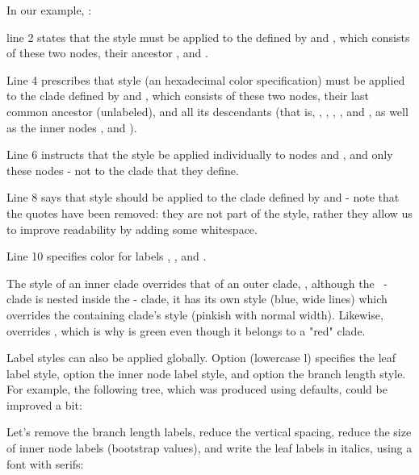 \noindent{}In our example, :
\startitemize
	\item line 2 states that the style  must be applied
		to the  defined by  and
		, which consists of these two nodes, their ancestor
		, and . 
	\item Line 4 prescribes that style  (an \svg{}
		hexadecimal color specification) must be applied to the clade defined by
		 and , which consists of these two nodes,
		their last common ancestor (unlabeled), and all its descendants (that is,
		, , , , and
		, as well as the inner nodes ,
		 and ). 
	\item Line 6 instructs that the style  be applied
		individually to nodes  and , and only
		these nodes - not to the clade that they define.  
	\item Line 8 says that style  should be
		applied to the clade defined by  and  - note that
		the quotes have been removed: they are not part of the style, rather they
		allow us to improve readability by adding some whitespace.
	\item Line 10 specifies color  for labels ,
		,
		and .
\stopitemize

The style of an inner clade overrides that of an outer clade, \eg,
although the ~-~ clade is nested inside the
 -  clade, it has its own style (blue, wide
lines) which overrides the containing clade's style (pinkish with normal
width).  Likewise,  overrides , which is why
 is green even though it belongs to a "red" clade.

\bigskip

Label styles can also be applied globally. Option  (lowercase l)
specifies the leaf label style, option  the inner node label style,
and option  the branch length style. For example, the following tree,
which was produced using defaults, could be improved a bit:


\noindent{}Let's remove the branch length labels, reduce
the vertical spacing, reduce the size of inner node labels (bootstrap values),
and write the leaf labels in italics, using a font with serifs:

